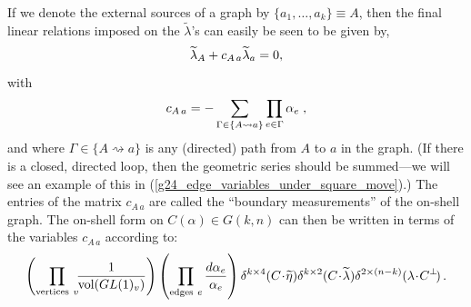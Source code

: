 \documentclass[12pt,hyperref,compress]{JHEP3}
\newcommand{\eq}[1]{\begin{equation}#1\end{equation}}
\begin{document}
If we denote the external sources of a graph by $\{a_1,\ldots,a_k\}\equiv A$, then the final linear relations imposed on the $\widetilde{\lambda}$'s can easily be seen to be given by,
\vspace{-.2cm}\eq{\widetilde{\lambda}_A+c_{A\,a}\widetilde{\lambda}_{a}=0,\vspace{-.2cm}}
with
\vspace{-.1cm}\eq{c_{A\,a}=-\sum_{\Gamma\in\{A\rightsquigarrow a\}}\prod_{e\in\Gamma}\alpha_e\;,\vspace{-.2cm}\label{general_link_in_terms_of_edges}}
and where $\Gamma\in\{A\!\rightsquigarrow\!a\}$ is any (directed) path from $A$ to $a$ in the graph. (If there is a closed, directed loop, then the geometric series should be summed---we will see an example of this in (\ref{g24_edge_variables_under_square_move}).) The entries of the matrix  $c_{A\,a}$ are called the ``boundary measurements'' of the on-shell graph. The on-shell form on $C(\alpha)\!\in\!G(k,n)$ can then be written in terms of the variables $c_{A\,a}$ according to:
\vspace{-.1cm}\eq{\left(\prod_{\mathrm{vertices~}v}\!\!\frac{1}{\mathrm{vol}(GL(1)_v)}\right)\left(\prod_{\mathrm{edges~}e}\frac{d\alpha_e}{\alpha_e}\right)\delta^{k\times4}(C\!\cdot\!\widetilde{\eta})\delta^{k\times2}(C\!\cdot\!\widetilde{\lambda})\delta^{2\times(n-k)}(\lambda\!\cdot\!C^{\perp}\!)\,.\vspace{-.2cm}\label{general_on_shell_form_in_edge_variables}}
\end{document}
